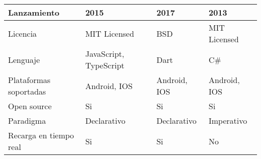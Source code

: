 \begin{longtable}{|p{3cm}|p{3cm}|p{3cm}|p{3cm}|}
    \hline \hline
    \endlastfoot
    Lanzamiento                                    & 2015                                                      & 2017                                                                                                           & 2013                                                                                                                         \\\hline
    Licencia                                       & MIT Licensed                                              & BSD                                                                                                            & MIT Licensed                                                                                                                 \\\hline
    Lenguaje                                       & JavaScript, TypeScript                                    & Dart                                                                                                           & C\#                                                                                                                          \\\hline
    Plataformas soportadas                         & Android, IOS                                              & Android, IOS                                                                                                   & Android, IOS                                                                                                                 \\\hline
    Open source                                    & Si                                                        & Si                                                                                                             & Si                                                                                                                           \\\hline
    Paradigma                                      & Declarativo                                               & Declarativo                                                                                                    & Imperativo                                                                                                                   \\\hline
    Recarga en tiempo real                         & Si                                                        & Si                                                                                                             & No                                                                                                                           \\\hline

\end{longtable}
